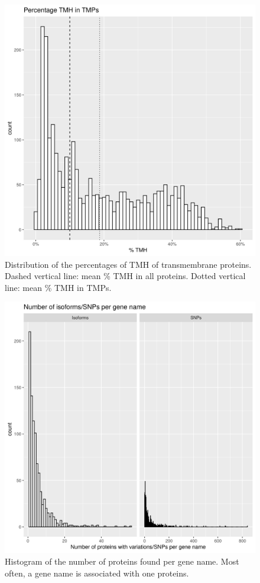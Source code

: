 \begin{figure}[!htbp]
  \includegraphics[width=\textwidth]{ncbi_peregrine_results/fig_f_tmh_ncbi.png}
  \caption{
    Distribution of the percentages of TMH of transmembrane proteins.
    Dashed vertical line: mean \% TMH in all proteins.
    Dotted vertical line: mean \% TMH in TMPs.
  }
  \label{fig:f_tmh_ncbi}
\end{figure}

\begin{figure}[!htbp]
  \includegraphics[width=\textwidth]{ncbi_peregrine_results/fig_n_proteins_per_gene_name.png}
  \caption{
    Histogram of the number of proteins found per gene name.
    Most often, a gene name is associated with one proteins. 
  }
  \label{fig:n_proteins_per_gene_name}
\end{figure}



